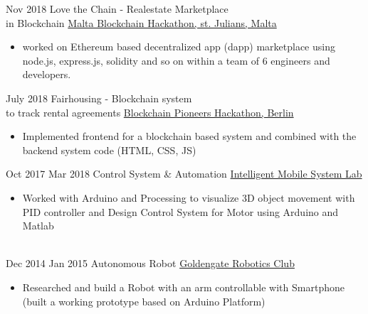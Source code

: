 \documentclass[letterpaper]{twentysecondcv} %
\begin{document}
\begin{twenty}
    \twentyitem
        {Nov 2018}
        {}
        {Love the Chain - Realestate Marketplace \\in Blockchain}
          {\href{}{Malta Blockchain Hackathon, st. Julians, Malta}}
        {
        {\begin{itemize}
            \item worked on Ethereum based decentralized app (dapp) marketplace using node.js, express.js, solidity and so on within a team of 6 engineers and developers. \\
        \end{itemize}}
        }
        
    \twentyitem
        {July 2018}
        {}
        {Fairhousing - Blockchain system \\to track rental agreements}
          {\href{https://berlin.impacthub.net/consultancy/our-offer/community-and-ecosystem-building/blockch8n-pioneers-hackathon/}{Blockchain Pioneers Hackathon, Berlin}}
        {
        {\begin{itemize}
            \item Implemented frontend for a blockchain based system and combined with the backend system code (HTML, CSS, JS)\\
        \end{itemize}}
        }

    \twentyitem
        {Oct 2017}
        {Mar 2018}
        {Control System \& Automation }
        {\href{http://imsys.user.jacobs-university.de}{Intelligent Mobile System Lab}}
        {
        {\begin{itemize}
            \item Worked with Arduino and Processing to visualize 3D object movement with PID controller and Design Control System for Motor using Arduino and Matlab\\
            
            \\
        \end{itemize}}
        }
        
    \twentyitem
        {Dec 2014}
        {Jan 2015}
        {Autonomous Robot }
        {\href{}{Goldengate Robotics Club}}
        {
        {\begin{itemize}
            \item Researched and build a Robot with an arm controllable with Smartphone (built a working prototype based on Arduino Platform)\\
        \end{itemize}}
        }

\end{twenty}
\end{document}
